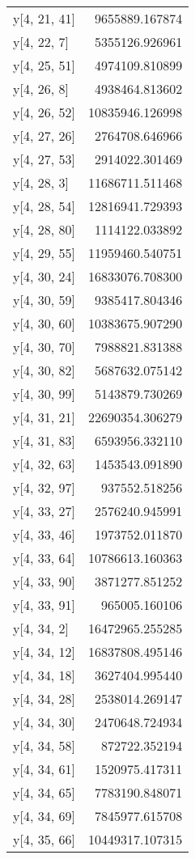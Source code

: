 \begin{longtable}{lr}
y[4, 21, 41] & 9655889.167874 \\
y[4, 22, 7] & 5355126.926961 \\
y[4, 25, 51] & 4974109.810899 \\
y[4, 26, 8] & 4938464.813602 \\
y[4, 26, 52] & 10835946.126998 \\
y[4, 27, 26] & 2764708.646966 \\
y[4, 27, 53] & 2914022.301469 \\
y[4, 28, 3] & 11686711.511468 \\
y[4, 28, 54] & 12816941.729393 \\
y[4, 28, 80] & 1114122.033892 \\
y[4, 29, 55] & 11959460.540751 \\
y[4, 30, 24] & 16833076.708300 \\
y[4, 30, 59] & 9385417.804346 \\
y[4, 30, 60] & 10383675.907290 \\
y[4, 30, 70] & 7988821.831388 \\
y[4, 30, 82] & 5687632.075142 \\
y[4, 30, 99] & 5143879.730269 \\
y[4, 31, 21] & 22690354.306279 \\
y[4, 31, 83] & 6593956.332110 \\
y[4, 32, 63] & 1453543.091890 \\
y[4, 32, 97] & 937552.518256 \\
y[4, 33, 27] & 2576240.945991 \\
y[4, 33, 46] & 1973752.011870 \\
y[4, 33, 64] & 10786613.160363 \\
y[4, 33, 90] & 3871277.851252 \\
y[4, 33, 91] & 965005.160106 \\
y[4, 34, 2] & 16472965.255285 \\
y[4, 34, 12] & 16837808.495146 \\
y[4, 34, 18] & 3627404.995440 \\
y[4, 34, 28] & 2538014.269147 \\
y[4, 34, 30] & 2470648.724934 \\
y[4, 34, 58] & 872722.352194 \\
y[4, 34, 61] & 1520975.417311 \\
y[4, 34, 65] & 7783190.848071 \\
y[4, 34, 69] & 7845977.615708 \\
y[4, 35, 66] & 10449317.107315 \\

\end{longtable}

